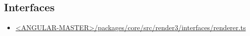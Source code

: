 \subsection{Interfaces}


\begin{itemize}
  \item \href{https://github.com/angular/angular/blob/master/packages/core/src/render3/interfaces/renderer.ts}
        {<ANGULAR-MASTER>/packages/core/src/render3/interfaces/renderer.ts}
\end{itemize}




















